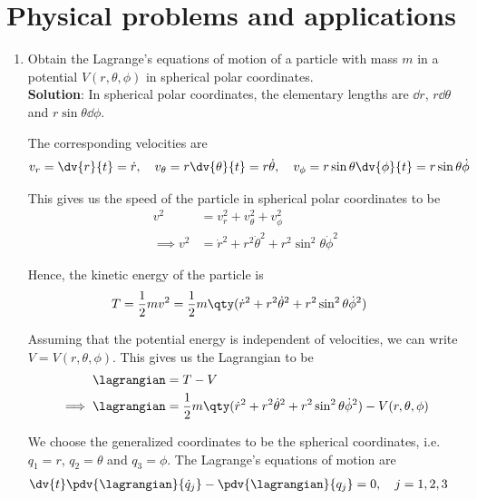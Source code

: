 \section{Physical problems and applications}

\begin{enumerate}
	\item Obtain the Lagrange's equations of motion of a particle with mass $m$ in a potential $V(r,\theta,\phi)$ in spherical polar coordinates.\\ \setcounter{equation}{0}
	\textbf{Solution}: In spherical polar coordinates, the elementary lengths are $\dd{r}$, $r\dd{\theta}$ and $r\sin{\theta}\dd{\phi}$.
	
	The corresponding velocities are
	\begin{align*}
		v_r=\dv{r}{t}=\dot{r},\quad v_\theta=r\dv{\theta}{t}=r\dot{\theta},\quad v_\phi=r\sin{\theta}\dv{\phi}{t}=r\sin{\theta}\dot{\phi}
	\end{align*}
	
	This gives us the speed of the particle in spherical polar coordinates to be
	\begin{align*}
		v^2&=v_r^2+v_\theta^2+v_\phi^2 \\
		\implies v^2&=\dot{r}^2+r^2\dot{\theta}^2+r^2\sin^2{\theta}\dot{\phi}^2
	\end{align*}
	
	Hence, the kinetic energy of the particle is
	\begin{align*}
		T&=\dfrac{1}{2}mv^2=\dfrac{1}{2}m\qty(\dot{r}^2+r^2\dot{\theta}^2+r^2\sin^2{\theta}\dot{\phi}^2)
	\end{align*}
	
	Assuming that the potential energy is independent of velocities, we can write $V=V(r,\theta,\phi)$. This gives us the Lagrangian to be
	\begin{align}
		\lagrangian&=T-V \nonumber\\
		\implies\lagrangian&=\dfrac{1}{2}m\qty(\dot{r}^2+r^2\dot{\theta}^2+r^2\sin^2{\theta}\dot{\phi}^2)-V(r,\theta,\phi) \label{eqn:lag-spc}
	\end{align}
	
	We choose the generalized coordinates to be the spherical coordinates, i.e. $q_1=r$, $q_2=\theta$ and $q_3=\phi$. The Lagrange's equations of motion are
	\begin{align}
		\dv{t}\pdv{\lagrangian}{\dot{q}_j}-\pdv{\lagrangian}{q_j}&=0,\quad j=1,2,3\label{eqn:eg-1:lagrange-eqn}
	\end{align}
	

\end{enumerate}
